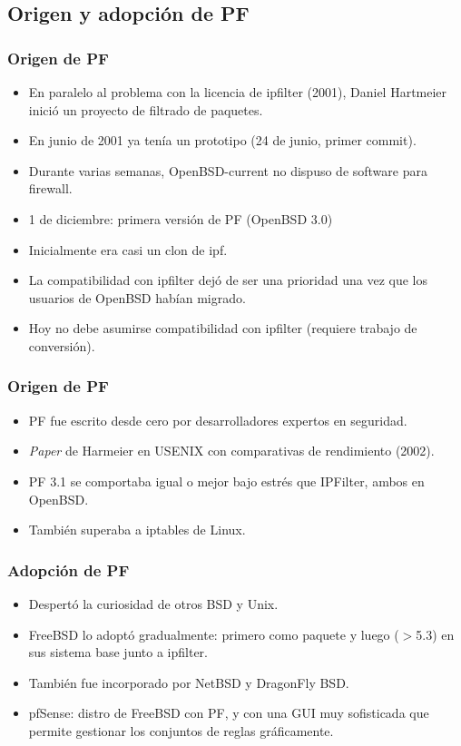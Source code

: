 \documentclass{beamer}
\begin{document}
\subsection{Origen y adopción de PF}
\begin{frame}
\frametitle{Origen de PF}

\begin{itemize}
\item En paralelo al problema con la licencia de ipfilter (2001), Daniel Hartmeier inició un proyecto de filtrado de paquetes.
\item En junio de 2001 ya tenía un prototipo (24 de junio, primer commit).
\item Durante varias semanas, OpenBSD-current no dispuso de software para firewall.
\item \alert{1 de diciembre: primera versión de PF} (OpenBSD 3.0)
\item Inicialmente era casi un clon de ipf.
\item La compatibilidad con ipfilter dejó de ser una prioridad una vez que los usuarios de OpenBSD habían migrado.
\item Hoy no debe asumirse compatibilidad con ipfilter (requiere trabajo de conversión).
\end{itemize}

\end{frame}



\begin{frame}
\frametitle{Origen de PF}

\begin{itemize}
\item PF fue escrito desde cero por desarrolladores expertos en seguridad. 
\item \textit{Paper} de Harmeier en USENIX con comparativas de rendimiento (2002). 
\item PF 3.1 se comportaba igual o mejor bajo estrés que IPFilter, ambos en OpenBSD.
\item También superaba a iptables de Linux.
\end{itemize}

\end{frame}


\begin{frame}
\frametitle{Adopción de PF}

\begin{itemize}
\item Despertó la curiosidad de otros BSD y Unix.
\item FreeBSD lo adoptó gradualmente: primero como paquete y luego ($>$5.3) en sus sistema base junto a ipfilter.
\item También fue incorporado por NetBSD y DragonFly BSD.
\item \alert{pfSense:} distro de FreeBSD con PF, y con una GUI muy sofisticada que permite gestionar los conjuntos de reglas gráficamente.  
\end{itemize}

\end{frame}
\end{document}
